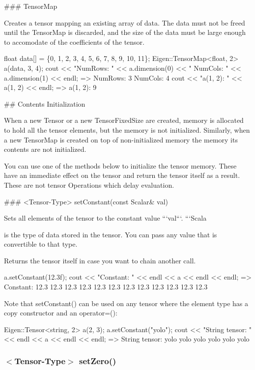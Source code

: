 \begin{DoxyCode}
### TensorMap

Creates a tensor mapping an existing array of data. The data must not be freed
until the TensorMap is discarded, and the size of the data must be large enough
to accomodate of the coefficients of the tensor.

    float data[] = \{0, 1, 2, 3, 4, 5, 6, 7, 8, 9, 10, 11\};
    Eigen::TensorMap<float, 2> a(data, 3, 4);
    cout << "NumRows: " << a.dimension(0) << " NumCols: " << a.dimension(1) << endl;
    => NumRows: 3 NumCols: 4
    cout << "a(1, 2): " << a(1, 2) << endl;
    => a(1, 2): 9


## Contents Initialization

When a new Tensor or a new TensorFixedSize are created, memory is allocated to
hold all the tensor elements, but the memory is not initialized.  Similarly,
when a new TensorMap is created on top of non-initialized memory the memory its
contents are not initialized.

You can use one of the methods below to initialize the tensor memory.  These
have an immediate effect on the tensor and return the tensor itself as a
result.  These are not tensor Operations which delay evaluation.

### <Tensor-Type> setConstant(const Scalar& val)

Sets all elements of the tensor to the constant value ```val```.  ```Scala
\end{DoxyCode}
 is the type of data stored in the tensor. You can pass any value that is convertible to that type.

Returns the tensor itself in case you want to chain another call. \begin{DoxyVerb}a.setConstant(12.3f);
cout << "Constant: " << endl << a << endl << endl;
=>
Constant:
12.3 12.3 12.3 12.3
12.3 12.3 12.3 12.3
12.3 12.3 12.3 12.3
\end{DoxyVerb}


Note that {\ttfamily set\+Constant()} can be used on any tensor where the element type has a copy constructor and an {\ttfamily operator=()}\+: \begin{DoxyVerb}Eigen::Tensor<string, 2> a(2, 3);
a.setConstant("yolo");
cout << "String tensor: " << endl << a << endl << endl;
=>
String tensor:
yolo yolo yolo
yolo yolo yolo
\end{DoxyVerb}


\subsubsection*{$<$Tensor-\/\+Type$>$ set\+Zero()}

